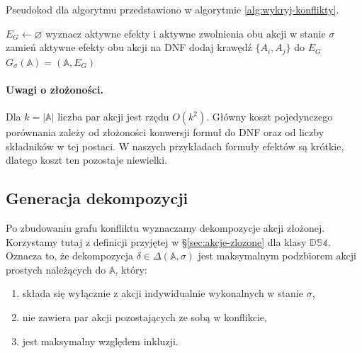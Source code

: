 \documentclass[11pt,a4paper]{article}
\theoremstyle{definition}
\begin{document}
Pseudokod dla algorytmu przedstawiono w algorytmie \ref{alg:wykryj-konflikty}.

\begin{algorithm}[H]
\caption{Pseudokod dla algorytmu wykrywającego konflikty}
\label{alg:wykryj-konflikty}
\begin{algorithmic}[1]
        \State $E_G \leftarrow \varnothing$
            \State wyznacz aktywne efekty i aktywne zwolnienia obu akcji w stanie $\sigma$
            \State zamień aktywne efekty obu akcji na DNF
                \State dodaj krawędź $\{A_i,A_j\}$ do $E_G$
            \EndIf
        \EndFor
        \Return $G_{\sigma}(\mathbb{A}) = (\mathbb{A}, E_G)$
    \EndProcedure
\end{algorithmic}
\end{algorithm}

\paragraph{Uwagi o złożoności.}
Dla $k=|\mathbb{A}|$ liczba par akcji jest rzędu $O(k^2)$. Główny koszt pojedynczego porównania zależy od złożoności konwersji formuł do DNF oraz od liczby składników w tej postaci. W naszych przykładach formuły efektów są krótkie, dlatego koszt ten pozostaje niewielki.

\subsection{Generacja dekompozycji}
\label{sec:alg-dekompozycje}

Po zbudowaniu grafu konfliktu wyznaczamy dekompozycje akcji złożonej. Korzystamy tutaj z definicji przyjętej w §\ref{sec:akcje-zlozone} dla klasy $\mathbb{DS4}$. Oznacza to, że dekompozycja $\delta \in \Delta(\mathbb{A},\sigma)$ jest maksymalnym podzbiorem akcji prostych należących do $\mathbb{A}$, który:
\begin{enumerate}
    \item składa się wyłącznie z akcji indywidualnie wykonalnych w stanie $\sigma$,
    \item nie zawiera par akcji pozostających ze sobą w konflikcie,
    \item jest maksymalny względem inkluzji.
\end{enumerate}
\end{document}
